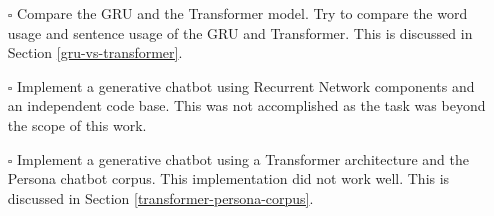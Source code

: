 \begin{itemize}
	\item[\rlap{\raisebox{0.3ex}{\hspace{0.4ex}\tiny \ding{52}}}$\square$] Compare the GRU and the Transformer model. Try to compare the word usage and sentence usage of the GRU and Transformer. This is discussed in Section \ref{gru-vs-transformer}.
	
	\item[\rlap{\raisebox{0.3ex}{\hspace{0.4ex}\scriptsize \ding{56}}}$\square$] Implement a generative chatbot using Recurrent Network components and an independent code base. This was not accomplished as the task was beyond the scope of this work.
	
	\item[\rlap{\raisebox{0.3ex}{\hspace{0.4ex}\scriptsize \ding{56}}}$\square$] Implement a generative chatbot using a Transformer architecture and the Persona chatbot corpus. This implementation did not work well. This is discussed in Section \ref{transformer-persona-corpus}. %
	
	
\end{itemize}

